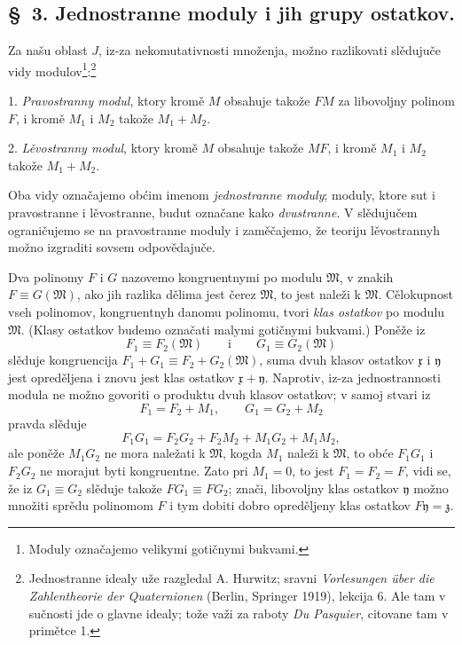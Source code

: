 \documentclass[11pt]{article}
\providecommand{\mM}{\mathfrak M}
\providecommand{\mx}{\mathfrak x}
\providecommand{\my}{\mathfrak y}
\providecommand{\mz}{\mathfrak z}
\begin{document}

\setcounter{footnote}{8}
\subsection*{\S~3. Jednostranne moduly i jih grupy ostatkov.}

Za našu oblast \(J\), iz-za nekomutativnosti množenja, možno razlikovati slědujuče vidy modulov\footnote{Moduly označajemo velikymi gotičnymi bukvami.}:\footnote{Jednostranne idealy uže razgledal A. Hurwitz; sravni \emph{Vorlesungen über die Zahlentheorie der Quaternionen} (Berlin, Springer 1919), lekcija 6. Ale tam v sučnosti jde o glavne idealy; tože važi za raboty \emph{Du Pasquier}, citovane tam v primětce 1.}

1. \textit{Pravostranny modul}, ktory kromě \(M\) obsahuje takože \(FM\) za libovoljny polinom \(F\), i kromě \(M_1\) i \(M_2\) takože \(M_1+M_2\).

2. \textit{Lěvostranny modul}, ktory kromě \(M\) obsahuje takože \(MF\), i kromě \(M_1\) i \(M_2\) takože \(M_1+M_2\).

Oba vidy označajemo obćim imenom \textit{jednostranne moduly}; moduly, ktore sut i pravostranne i lěvostranne, budut označane kako \textit{dvustranne}. V slědujučem ograničujemo se na pravostranne moduly i zaměčajemo, že teoriju lěvostrannyh možno izgraditi sovsem odpovědajuče.

Dva polinomy \(F\) i \(G\) nazovemo kongruentnymi po modulu \(\mM\), v znakih \(F\equiv G(\mM)\), ako jih razlika dělima jest čerez \(\mM\), to jest naleži k \(\mM\). Cělokupnost vseh polinomov, kongruentnyh danomu polinomu, tvori \textit{klas ostatkov} po modulu \(\mM\). (Klasy ostatkov budemo označati malymi gotičnymi bukvami.) Poněže iz
\[
 F_1\equiv F_2(\mM)\qquad\text{i}\qquad G_1\equiv G_2(\mM)
\]
slěduje kongruencija \(F_1+G_1\equiv F_2+G_2(\mM)\), suma dvuh klasov ostatkov \(\mx\) i \(\my\) jest opreděljena i znovu jest klas ostatkov \(\mx+\my\). Naprotiv, iz-za jednostrannosti modula ne možno govoriti o produktu dvuh klasov ostatkov; v samoj stvari iz
\[
 F_1=F_2+M_1,\qquad G_1=G_2+M_2
\]
pravda slěduje
\[
 F_1G_1=F_2G_2+F_2M_2+M_1G_2+M_1M_2,
\]
ale poněže \(M_1G_2\) ne mora naležati k \(\mM\), kogda \(M_1\) naleži k \(\mM\), to obće \(F_1G_1\) i \(F_2G_2\) ne morajut byti kongruentne. Zato pri \(M_1=0\), to jest \(F_1=F_2=F\), vidi se, že iz \(G_1\equiv G_2\) slěduje takože \(FG_1\equiv FG_2\); znači, libovoljny klas ostatkov \(\my\) možno množiti sprědu polinomom \(F\) i tym dobiti dobro opreděljeny klas ostatkov \(F\my=\mz\).
\end{document}
